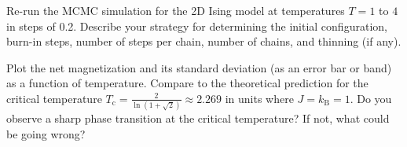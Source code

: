 \begin{problem}[20]
Re-run the MCMC simulation for the 2D Ising model at temperatures $T=1$ to $4$ in steps of 0.2.
Describe your strategy for determining the initial configuration, burn-in steps, number of steps per chain, number of chains, and thinning (if any).

Plot the net magnetization and its standard deviation (as an error bar or band) as a function of temperature.
Compare to the theoretical prediction for the critical temperature $T_\mathrm{c}=\frac{2}{\ln(1+\sqrt{2})}\approx 2.269$ in units where $J=k_\mathrm{B}=1$.
Do you observe a sharp phase transition at the critical temperature? If not, what could be going wrong?
\end{problem}



